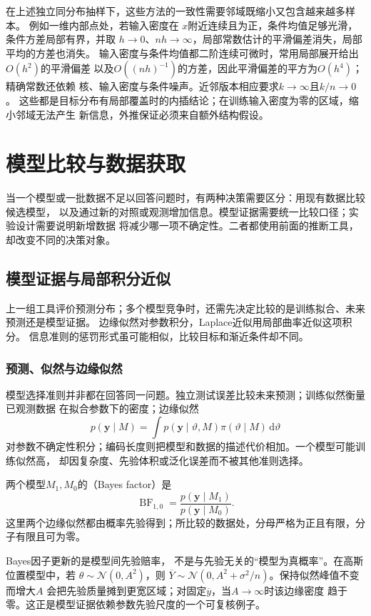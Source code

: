 在上述独立同分布抽样下，这些方法的一致性需要邻域既缩小又包含越来越多样本。
例如一维内部点处，若输入密度在
\(x\)附近连续且为正，条件均值足够光滑，条件方差局部有界，并取
\(h\to0\)、\(nh\to\infty\)，局部常数估计的平滑偏差消失，局部平均的方差也消失。
输入密度与条件均值都二阶连续可微时，常用局部展开给出\(O(h^2)\)的平滑偏差
以及\(O((nh)^{-1})\)的方差，因此平滑偏差的平方为\(O(h^4)\)；精确常数还依赖
核、输入密度与条件噪声。近邻版本相应要求\(k\to\infty\)且\(k/n\to0\)。
这些都是目标分布有局部覆盖时的内插结论；在训练输入密度为零的区域，缩小邻域无法产生
新信息，外推保证必须来自额外结构假设。

\section{模型比较与数据获取}
\label{sec:stats-model-comparison-data-acquisition}

当一个模型或一批数据不足以回答问题时，有两种决策需要区分：用现有数据比较候选模型，
以及通过新的对照或观测增加信息。模型证据需要统一比较口径；实验设计需要说明新增数据
将减少哪一项不确定性。二者都使用前面的推断工具，却改变不同的决策对象。

\subsection{模型证据与局部积分近似}
\label{sec:statistics-model-evidence}

上一组工具评价预测分布；多个模型竞争时，还需先决定比较的是训练拟合、未来预测还是模型证据。
边缘似然对参数积分，Laplace近似用局部曲率近似这项积分。
信息准则的惩罚形式虽可能相似，比较目标和渐近条件却不同。

\subsubsection{预测、似然与边缘似然}

模型选择准则并非都在回答同一问题。独立测试误差比较未来预测；训练似然衡量已观测数据
在拟合参数下的密度；边缘似然
\[
  p(\bm y\mid M)
  =\int p(\bm y\mid\vartheta,M)\pi(\vartheta\mid M)\,\mathrm d\vartheta
\]
对参数不确定性积分；编码长度则把模型和数据的描述代价相加。一个模型可能训练似然高，
却因复杂度、先验体积或泛化误差而不被其他准则选择。

\begin{definition}[Bayes因子]
  \label{def:statistics-bayes-factor}
两个模型\(M_1,M_0\)的（Bayes factor）是
\[
  \operatorname{BF}_{1,0}
  =\frac{p(\bm y\mid M_1)}{p(\bm y\mid M_0)}.
\]
这里两个边缘似然都由概率先验得到；所比较的数据处，分母严格为正且有限，分子有限且可为零。
\end{definition}
Bayes因子更新的是模型间先验赔率，
不是与先验无关的“模型为真概率”。在高斯位置模型中，若
\(\theta\sim\mathcal N(0,A^2)\)，则
\(\overline Y\sim\mathcal N(0,A^2+\sigma^2/n)\)。保持似然峰值不变而增大\(A\)
会把先验质量摊到更宽区域；对固定\(\overline y\)，当\(A\to\infty\)时该边缘密度
趋于零。这正是模型证据依赖参数先验尺度的一个可复核例子。

